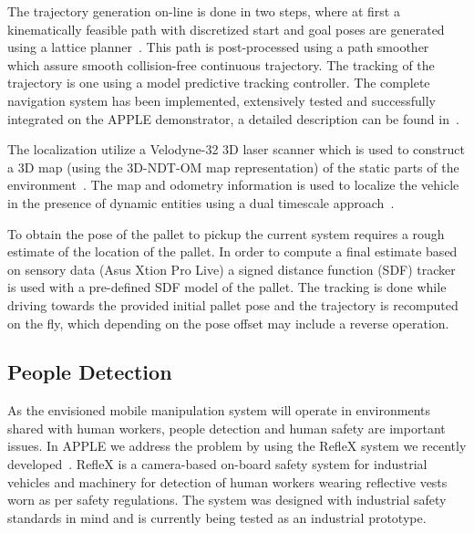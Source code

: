 The trajectory generation on-line is done in two steps, where at first a kinematically feasible path
with discretized start and goal poses are generated using a lattice planner~\cite{Ciri14}. This path
is post-processed using a path smoother~\cite{Andr15} which assure smooth collision-free continuous
trajectory. The tracking of the trajectory is one using a model predictive tracking controller. The
complete navigation system has been implemented, extensively tested and successfully integrated on
the APPLE demonstrator, a detailed description can be found in~\cite{Andr15}.

The localization utilize a Velodyne-32 3D laser scanner which is used to construct a 3D map (using
the 3D-NDT-OM map representation) of the static parts of the environment~\cite{Stoy13}. The map and
odometry information is used to localize the vehicle in the presence of dynamic entities using a
dual timescale approach~\cite{Vale14}.

To obtain the pose of the pallet to pickup the current system requires a rough estimate of the
location of the pallet. In order to compute a final estimate based on sensory data (Asus Xtion Pro
Live) a signed distance function (SDF) tracker~\cite{Cane13} is used with a pre-defined SDF model of
the pallet. The tracking is done while driving towards the provided initial pallet pose and the
trajectory is recomputed on the fly, which depending on the pose offset may include a reverse
operation.
%
\subsection{People Detection}
\label{subsec:people_det}
%
As the envisioned mobile manipulation system will operate in environments shared with human workers,
people detection and human safety are important issues. In APPLE we address the problem by using the
RefleX system we recently developed~\cite{Mosb14}. RefleX is a camera-based on-board safety system
for industrial vehicles and machinery for detection of human workers wearing reflective vests worn
as per safety regulations. The system was designed with industrial safety standards in mind and is
currently being tested as an industrial prototype.
%
